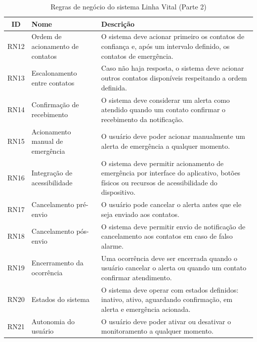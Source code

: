 \begin{table}[H]
\caption{Regras de negócio do sistema Linha Vital (Parte 2)}
\label{quad_rn2}
\centering

\begin{tabular}{|c|p{4cm}|p{8cm}|}
\hline
\textbf{ID} & \textbf{Nome} & \textbf{Descrição} \\
\hline

RN12 & Ordem de acionamento de contatos &
O sistema deve acionar primeiro os contatos de confiança e, após um intervalo definido, os contatos de emergência. \\
\hline


RN13 & Escalonamento entre contatos &
Caso não haja resposta, o sistema deve acionar outros contatos disponíveis respeitando a ordem definida. \\
\hline

RN14 & Confirmação de recebimento &
O sistema deve considerar um alerta como atendido quando um contato confirmar o recebimento da notificação. \\
\hline

RN15 & Acionamento manual de emergência &
O usuário deve poder acionar manualmente um alerta de emergência a qualquer momento. \\
\hline

RN16 & Integração de acessibilidade &
O sistema deve permitir acionamento de emergência por interface do aplicativo, botões físicos ou recursos de acessibilidade do dispositivo. \\
\hline

RN17 & Cancelamento pré-envio &
O usuário pode cancelar o alerta antes que ele seja enviado aos contatos. \\
\hline

RN18 & Cancelamento pós-envio &
O sistema deve permitir envio de notificação de cancelamento aos contatos em caso de falso alarme. \\
\hline

RN19 & Encerramento da ocorrência &
Uma ocorrência deve ser encerrada quando o usuário cancelar o alerta ou quando um contato confirmar atendimento. \\
\hline

RN20 & Estados do sistema &
O sistema deve operar com estados definidos: inativo, ativo, aguardando confirmação, em alerta e emergência acionada. \\
\hline

RN21 & Autonomia do usuário &
O usuário deve poder ativar ou desativar o monitoramento a qualquer momento. \\
\hline


\end{tabular}
\end{table}
